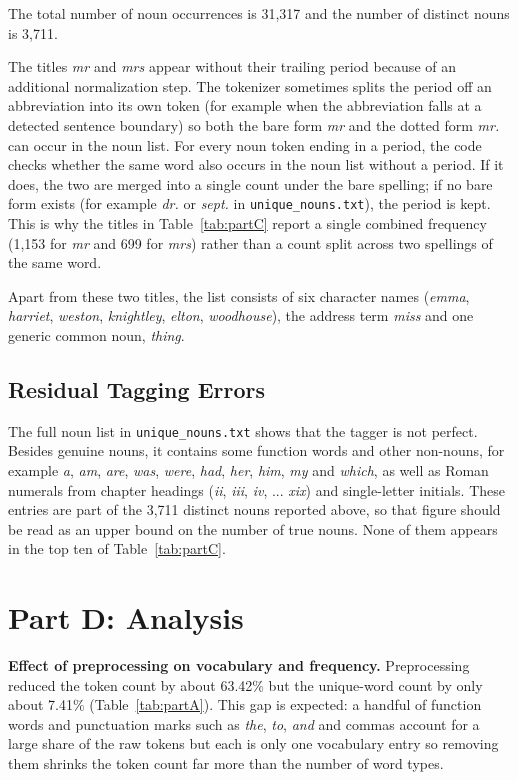\documentclass[sigconf]{acmart}
\begin{document}
The total number of noun occurrences is 31,317 and the number of distinct
nouns is 3,711.

The titles \textit{mr} and \textit{mrs} appear without their trailing period
because of an additional normalization step. The tokenizer sometimes splits
the period off an abbreviation into its own token (for example when the
abbreviation falls at a detected sentence boundary) so both the bare form
\textit{mr} and the dotted form \textit{mr.} can occur in the noun list.
For every noun token ending in a period, the code checks whether the same
word also occurs in the noun list without a period. If it does, the two
are merged into a single count under the bare spelling; if no bare form
exists (for example \textit{dr.} or \textit{sept.} in
\texttt{unique\_nouns.txt}), the period is kept. This is why the titles in
Table~\ref{tab:partC} report a single combined frequency (1,153 for
\textit{mr} and 699 for \textit{mrs}) rather than a count split across two
spellings of the same word.

Apart from these two titles, the list consists of six character names
(\textit{emma}, \textit{harriet}, \textit{weston}, \textit{knightley},
\textit{elton}, \textit{woodhouse}), the address term \textit{miss} and one
generic common noun, \textit{thing}.

\subsection{Residual Tagging Errors}
\label{sec:residual}

The full noun list in \texttt{unique\_nouns.txt} shows that the tagger is
not perfect. Besides genuine nouns, it contains some function words and
other non-nouns, for example \textit{a}, \textit{am}, \textit{are},
\textit{was}, \textit{were}, \textit{had}, \textit{her}, \textit{him},
\textit{my} and \textit{which}, as well as Roman numerals from chapter
headings (\textit{ii}, \textit{iii}, \textit{iv}, ... \textit{xix}) and
single-letter initials. These entries are part of the 3,711 distinct nouns
reported above, so that figure should be read as an upper bound on the
number of true nouns. None of them appears in the top ten of
Table~\ref{tab:partC}.

\section{Part D: Analysis}

\textbf{Effect of preprocessing on vocabulary and frequency.} Preprocessing
reduced the token count by about 63.42\% but the unique-word count by only
about 7.41\% (Table~\ref{tab:partA}). This gap is expected: a handful of
function words and punctuation marks such as \textit{the}, \textit{to},
\textit{and} and commas account for a large share of the raw tokens but
each is only one vocabulary entry so removing them shrinks the token count
far more than the number of word types.
\end{document}
